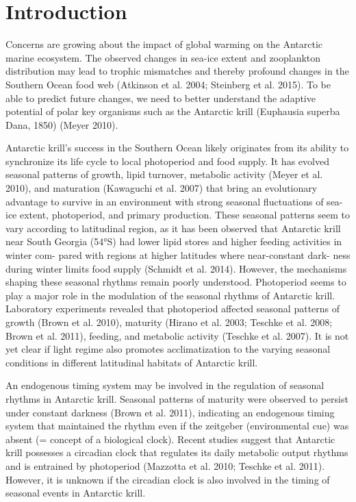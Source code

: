 \section{Introduction}
Concerns are growing about the impact of global warming on the Antarctic marine ecosystem. The observed changes in sea-ice extent and zooplankton distribution may lead to trophic mismatches and thereby profound changes in the Southern Ocean food web (Atkinson et al. 2004; Steinberg et al. 2015). To be able to predict future changes, we need to better understand the adaptive potential of polar key organisms such as the Antarctic krill (Euphausia superba Dana, 1850) (Meyer 2010). 

Antarctic krill’s success in the Southern Ocean likely originates from its ability to synchronize its life cycle to local photoperiod and food supply. It has evolved seasonal patterns of growth, lipid turnover, metabolic activity (Meyer et al. 2010), and maturation (Kawaguchi et al. 2007) that bring an evolutionary advantage to survive in an environment with strong seasonal fluctuations of sea-ice extent, photoperiod, and primary production. These seasonal patterns seem to vary according to latitudinal region, as it has been observed that Antarctic krill near South Georgia (54°S) had lower lipid stores and higher feeding activities in winter com- pared with regions at higher latitudes where near-constant dark- ness during winter limits food supply (Schmidt et al. 2014). However, the mechanisms shaping these seasonal rhythms remain poorly understood. 
Photoperiod seems to play a major role in the modulation of the seasonal rhythms of Antarctic krill. Laboratory experiments revealed that photoperiod affected seasonal patterns of growth (Brown et al. 2010), maturity (Hirano et al. 2003; Teschke et al. 2008; Brown et al. 2011), feeding, and metabolic activity (Teschke et al. 2007). It is not yet clear if light regime also promotes acclimatization to the varying seasonal conditions in different latitudinal habitats of Antarctic krill. 

An endogenous timing system may be involved in the regulation of seasonal rhythms in Antarctic krill. Seasonal patterns of maturity were observed to persist under constant darkness (Brown et al. 2011), indicating an endogenous timing system that maintained the rhythm even if the zeitgeber (environmental cue) was absent (= concept of a biological clock). Recent studies suggest that Antarctic krill possesses a circadian clock that regulates its daily metabolic output rhythms and is entrained by photoperiod (Mazzotta et al. 2010; Teschke et al. 2011). However, it is unknown if the circadian clock is also involved in the timing of seasonal events in Antarctic krill. 

